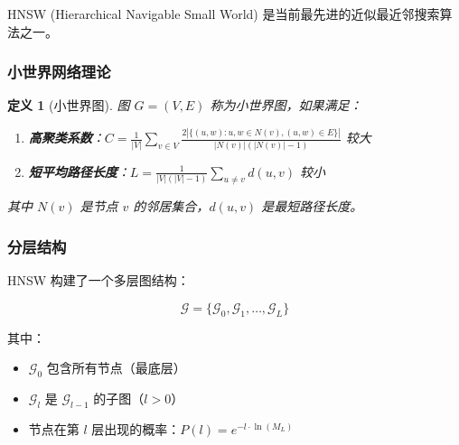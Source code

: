\documentclass[12pt,a4paper]{article}
\newtheorem{definition}{定义}[section]
\begin{document}
HNSW (Hierarchical Navigable Small World) 是当前最先进的近似最近邻搜索算法之一。

\subsubsection{小世界网络理论}

\begin{definition}[小世界图]
图 $G = (V, E)$ 称为小世界图，如果满足：
\begin{enumerate}
    \item \textbf{高聚类系数}：$C = \frac{1}{|V|} \sum_{v \in V} \frac{2|\{(u,w): u,w \in N(v), (u,w) \in E\}|}{|N(v)|(|N(v)|-1)}$ 较大
    \item \textbf{短平均路径长度}：$L = \frac{1}{|V|(|V|-1)} \sum_{u \neq v} d(u,v)$ 较小
\end{enumerate}
其中 $N(v)$ 是节点 $v$ 的邻居集合，$d(u,v)$ 是最短路径长度。
\end{definition}

\subsubsection{分层结构}

HNSW 构建了一个多层图结构：

\begin{equation}
\mathcal{G} = \{\mathcal{G}_0, \mathcal{G}_1, \ldots, \mathcal{G}_L\}
\end{equation}

其中：
\begin{itemize}
    \item $\mathcal{G}_0$ 包含所有节点（最底层）
    \item $\mathcal{G}_l$ 是 $\mathcal{G}_{l-1}$ 的子图（$l > 0$）
    \item 节点在第 $l$ 层出现的概率：$P(l) = e^{-l \cdot \ln(M_L)}$
\end{itemize}
\end{document}
